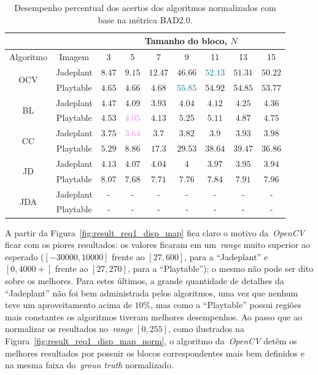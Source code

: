 \begin{table}[!ht]
    \centering
    \small
    \begin{tabular}{c|c|c|c|c|c|c|c|c}
        \cline{3-9}
        \multicolumn{2}{l}{} & \multicolumn{7}{c}{Tamanho do bloco, $N$} \\ \hline
        Algoritmo & Imagem & 3 & 5 & 7 & 9 & 11 & 13 & 15 \\ \hline
        \multirow{2}{*}{OCV} & Jadeplant & $8.47$ & $9.15$ & $12.47$ & $46.66$ & \textcolor{teal}{$52.13$} & $51.31$ & $50.22$ \\ \cline{2-9}
         & Playtable & $4.65$ & $4.66$ & $4.68$ & \textcolor{teal}{$55.85$} & $54.92$ & $54.85$ & $53.77$ \\ \hline
        \multirow{2}{*}{BL} & Jadeplant & $4.47$ & $4.09$ & $3.93$ & $4.04$ & $4.12$ & $4.25$ & $4.36$ \\ \cline{2-9}
         & Playtable & $4.53$ & \textcolor{violet}{$4.05$} & $4.13$ & $5.25$ & $5.11$ & $4.87$ & $4.75$ \\ \hline
        \multirow{2}{*}{CC} & Jadeplant & $3.75$ & \textcolor{violet}{$3.64$} & $3.7$ & $3.82$ & $3.9$ & $3.93$ & $3.98$ \\ \cline{2-9}
         & Playtable & $5.29$ & $8.86$ & $17.3$ & $29.53$ & $38.64$ & $39.47$ & $36.86$ \\ \hline
        \multirow{2}{*}{JD} & Jadeplant & $4.13$ & $4.07$ & $4.04$ & $4$ & $3.97$ & $3.95$ & $3.94$ \\ \cline{2-9}
         & Playtable & $8.07$ & $7.68$ & $7.71$ & $7.76$ & $7.84$ & $7.91$ & $7.96$ \\ \hline
        \multirow{2}{*}{JDA} & Jadeplant & - & - & - & - & - & - & - \\ \cline{2-9}
         & Playtable & - & - & - & - & - & - & - \\ \hline
    \end{tabular}
    \caption{Desempenho percentual dos acertos dos algoritmos normalizados com base na métrica BAD2.0.}
    \label{tab:result_req1_perf_norm}
\end{table}

A partir da Figura~\ref{fig:result_req1_disp_map} fica claro o motivo da~\emph{OpenCV} ficar com os piores resultados: os valores ficaram em um~\emph{range} muito superior ao esperado ($[-30000, 10000]$ frente ao $[27, 600]$, para a ``Jadeplant'' e $[0, 4000+]$ frente ao $[27, 270]$, para a ``Playtable''); o mesmo não pode ser dito sobre os melhores. Para estes últimos, a grande quantidade de detalhes da ``Jadeplant'' não foi bem administrada pelos algoritmos, uma vez que nenhum teve um aproveitamento acima de $10\%$, mas como a ``Playtable'' possui regiões mais constantes os algoritmos tiveram melhores desempenhos. Ao passo que ao normalizar os resultados no~\emph{range} $[0, 255]$, como ilustrados na Figura~\ref{fig:result_req1_disp_map_norm}, o algoritmo da~\emph{OpenCV} detêm os melhores resultados por possuir os blocos correspondentes mais bem definidos e na mesma faixa do~\emph{groun truth} normalizado.

